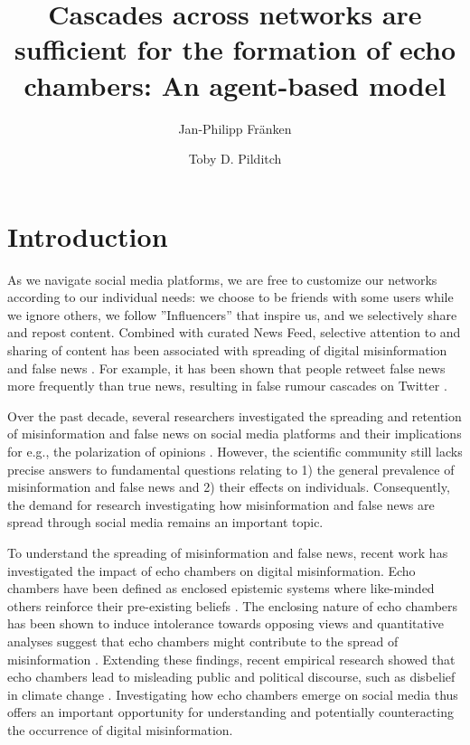 \documentclass[doc,floatsintext]{apa6}
\title{\textbf{Cascades across networks are sufficient for the formation of echo chambers: An agent-based model}}
\author[1]{Jan-Philipp Fr{\"a}nken}
\author[2 3]{Toby D. Pilditch}
\affil[1]{Department of Psychology, University of Edinburgh}
\affil[2]{School of Geography and the Environment, University of Oxford}
\affil[3]{Department of Experimental Psychology, University College London}
\affiliation{\mbox{}}
\begin{document}
\setlength{\parindent}{2em}
\maketitle
\pagebreak
\section{Introduction}

As we navigate social media platforms, we are free to customize our networks according to our individual needs: we choose to be friends with some users while we ignore others, we follow ''Influencers'' that inspire us, and we selectively share and repost content. Combined with curated News Feed, selective attention to and sharing of content has been associated with spreading of digital misinformation \citep{del2016spreading} and false news \citep{vosoughi2018spread}. For example, it has been shown that people retweet false news more frequently than true news, resulting in false rumour cascades on Twitter \citep{vosoughi2018spread, dizikes2018study}. 

Over the past decade, several researchers investigated the spreading and retention of misinformation and false news on social media platforms \citep{starbird2014rumors, bessi2015science, bakshy2015exposure, del2016spreading} and their implications for e.g., the polarization of opinions \citep{bessi2016users}. However, the scientific community still lacks precise answers to fundamental questions relating to 1) the general prevalence of misinformation and false news \citep{lazer2018science} and 2) their effects on individuals. Consequently, the demand for research investigating how misinformation and false news are spread through social media remains an important topic. 

To understand the spreading of misinformation and false news, recent work has investigated the impact of echo chambers on digital misinformation. Echo chambers have been defined as enclosed epistemic systems where like-minded others reinforce their  pre-existing beliefs \citep{madsen2018large}. The enclosing nature of echo chambers has been shown to induce intolerance towards opposing views \citep{takikawa2017political} and quantitative analyses suggest that echo chambers might contribute to the  spread of misinformation \citep{tornberg2018echo, del2016spreading}. Extending these findings, recent empirical research showed that echo chambers lead to misleading public and political discourse, such as disbelief in climate change \citep{jasny2015empirical, jasny2019echo}. Investigating how echo chambers emerge on social media thus offers an important opportunity for understanding and potentially counteracting the occurrence of digital misinformation.
\end{document}
